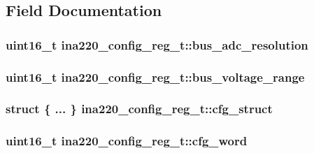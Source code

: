 \subsection{Field Documentation}
\hypertarget{unionina220__config__reg__t_a34b5582b6b0f9b49b58dcb8c205578be}{
\subsubsection[{bus\-\_\-adc\-\_\-resolution}]{\setlength{\rightskip}{0pt plus 5cm}uint16\-\_\-t ina220\-\_\-config\-\_\-reg\-\_\-t\-::bus\-\_\-adc\-\_\-resolution}}\label{unionina220__config__reg__t_a34b5582b6b0f9b49b58dcb8c205578be}
\hypertarget{unionina220__config__reg__t_adbc6b1cc7e8f467de1a58c2f4d5bf80f}{
\subsubsection[{bus\-\_\-voltage\-\_\-range}]{\setlength{\rightskip}{0pt plus 5cm}uint16\-\_\-t ina220\-\_\-config\-\_\-reg\-\_\-t\-::bus\-\_\-voltage\-\_\-range}}\label{unionina220__config__reg__t_adbc6b1cc7e8f467de1a58c2f4d5bf80f}
\hypertarget{unionina220__config__reg__t_aa8d92a428baf1e396aeb85fc80b42844}{
\subsubsection[{cfg\-\_\-struct}]{\setlength{\rightskip}{0pt plus 5cm}struct \{ ... \}   ina220\-\_\-config\-\_\-reg\-\_\-t\-::cfg\-\_\-struct}}\label{unionina220__config__reg__t_aa8d92a428baf1e396aeb85fc80b42844}
\hypertarget{unionina220__config__reg__t_a20d82853bb659aa69702d48aabc920b3}{
\subsubsection[{cfg\-\_\-word}]{\setlength{\rightskip}{0pt plus 5cm}uint16\-\_\-t ina220\-\_\-config\-\_\-reg\-\_\-t\-::cfg\-\_\-word}}\label{unionina220__config__reg__t_a20d82853bb659aa69702d48aabc920b3}
